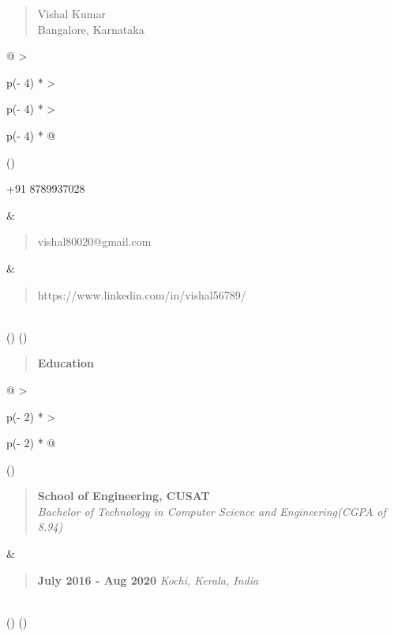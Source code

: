 \documentclass[
]{article}
\author{}
\date{}
\begin{document}
\begin{quote}
Vishal Kumar\\
Bangalore, Karnataka
\end{quote}

\begin{longtable}[]{@{}
  >{\raggedright\arraybackslash}p{(\columnwidth - 4\tabcolsep) * }
  >{\raggedright\arraybackslash}p{(\columnwidth - 4\tabcolsep) * }
  >{\raggedright\arraybackslash}p{(\columnwidth - 4\tabcolsep) * }@{}}
\toprule()
\begin{minipage}[b]{\linewidth}\raggedright
+91 8789937028
\end{minipage} & \begin{minipage}[b]{\linewidth}\raggedright
\begin{quote}
vishal80020@gmail.com
\end{quote}
\end{minipage} & \begin{minipage}[b]{\linewidth}\raggedright
\begin{quote}
https://www.linkedin.com/in/vishal56789/
\end{quote}
\end{minipage} \\
\midrule()
\endhead
\bottomrule()
\end{longtable}

\begin{quote}
\textbf{Education}
\end{quote}



\begin{longtable}[]{@{}
  >{\raggedright\arraybackslash}p{(\columnwidth - 2\tabcolsep) * }
  >{\raggedright\arraybackslash}p{(\columnwidth - 2\tabcolsep) * }@{}}
\toprule()


\begin{minipage}[b]{\linewidth}\raggedright
\begin{quote}
\textbf{School of Engineering, CUSAT}\\
\emph{Bachelor of Technology in Computer Science and Engineering(CGPA of
8.94)}
\end{quote}\strut
\end{minipage} & \begin{minipage}[b]{\linewidth}\raggedright
\begin{quote}
\textbf{July 2016 - Aug 2020} \emph{Kochi, Kerala, India}
\end{quote}
\end{minipage} \\
\midrule()
\endhead
\bottomrule()


\end{longtable}
\end{document}
